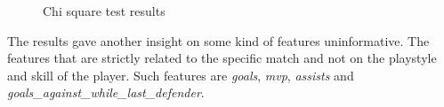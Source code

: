 \begin{figure}[H]
    \label{fig:chi_square}
    \caption{Chi square test results} 
\end{figure}

The results gave another insight on some kind of features uninformative. The features that are strictly related to the specific match and not on the playstyle and skill of the player. Such features are \textit{goals}, \textit{mvp}, \textit{assists} and \textit{goals\_against\_while\_last\_defender}.